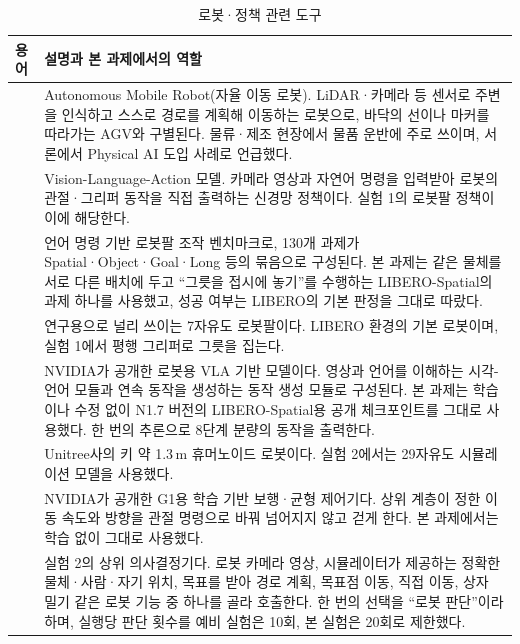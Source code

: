 \begin{table}[H]
\centering\small
\caption{로봇·정책 관련 도구}
\begin{tabularx}{\linewidth}{@{}>{\raggedright\arraybackslash}p{30mm}Y@{}}
\toprule
용어 & 설명과 본 과제에서의 역할 \\
\midrule
{} & Autonomous Mobile Robot(자율 이동 로봇). LiDAR·카메라 등 센서로 주변을 인식하고 스스로 경로를 계획해 이동하는 로봇으로, 바닥의 선이나 마커를 따라가는 AGV와 구별된다. 물류·제조 현장에서 물품 운반에 주로 쓰이며, 서론에서 Physical AI 도입 사례로 언급했다. \\
 & Vision-Language-Action 모델. 카메라 영상과 자연어 명령을 입력받아 로봇의 관절·그리퍼 동작을 직접 출력하는 신경망 정책이다. 실험 1의 로봇팔 정책이 이에 해당한다. \\
 & 언어 명령 기반 로봇팔 조작 벤치마크로, 130개 과제가 Spatial·Object·Goal·Long 등의 묶음으로 구성된다. 본 과제는 같은 물체를 서로 다른 배치에 두고 ``그릇을 접시에 놓기''를 수행하는 LIBERO-Spatial의 과제 하나를 사용했고, 성공 여부는 LIBERO의 기본 판정을 그대로 따랐다. \\
 & 연구용으로 널리 쓰이는 7자유도 로봇팔이다. LIBERO 환경의 기본 로봇이며, 실험 1에서 평행 그리퍼로 그릇을 집는다. \\
 & NVIDIA가 공개한 로봇용 VLA 기반 모델이다. 영상과 언어를 이해하는 시각-언어 모듈과 연속 동작을 생성하는 동작 생성 모듈로 구성된다. 본 과제는 학습이나 수정 없이 N1.7 버전의 LIBERO-Spatial용 공개 체크포인트를 그대로 사용했다. 한 번의 추론으로 8단계 분량의 동작을 출력한다. \\
 & Unitree사의 키 약 1.3\,m 휴머노이드 로봇이다. 실험 2에서는 29자유도 시뮬레이션 모델을 사용했다. \\
 & NVIDIA가 공개한 G1용 학습 기반 보행·균형 제어기다. 상위 계층이 정한 이동 속도와 방향을 관절 명령으로 바꿔 넘어지지 않고 걷게 한다. 본 과제에서는 학습 없이 그대로 사용했다. \\
 & 실험 2의 상위 의사결정기다. 로봇 카메라 영상, 시뮬레이터가 제공하는 정확한 물체·사람·자기 위치, 목표를 받아 경로 계획, 목표점 이동, 직접 이동, 상자 밀기 같은 로봇 기능 중 하나를 골라 호출한다. 한 번의 선택을 ``로봇 판단''이라 하며, 실행당 판단 횟수를 예비 실험은 10회, 본 실험은 20회로 제한했다. \\
\bottomrule
\end{tabularx}
\end{table}

